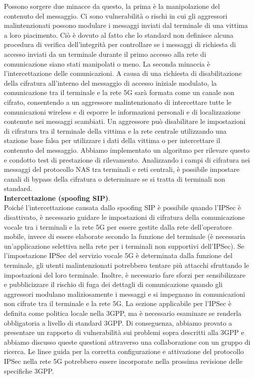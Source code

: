 \documentclass[english]{article}
\begin{document}
Possono sorgere due minacce da questo, la prima è la manipolazione del
contenuto del messaggio. Ci sono vulnerabilità o rischi in cui gli aggressori
malintenzionati possono modulare i messaggi inviati dal terminale di una
vittima a loro piacimento. Ciò è dovuto al fatto che lo standard non definisce
alcuna procedura di verifica dell'integrità per controllare se i messaggi di
richiesta di accesso inviati da un terminale durante il primo accesso alla rete
di comunicazione siano stati manipolati o meno. La seconda minaccia è
l'intercettazione delle comunicazioni. A causa di una richiesta di
disabilitazione della cifratura all'interno del messaggio di accesso iniziale
modulato, la comunicazione tra il terminale e la rete 5G sarà formata come un
canale non cifrato, consentendo a un aggressore malintenzionato di intercettare
tutte le comunicazioni wireless e di esporre le informazioni personali e di
localizzazione contenute nei messaggi scambiati. Un aggressore può disabilitare
le impostazioni di cifratura tra il terminale della vittima e la rete centrale
utilizzando una stazione base falsa per utilizzare i dati della vittima o per
intercettare il contenuto del messaggio. Abbiamo implementato un algoritmo per
rilevare questo e condotto test di prestazione di rilevamento. Analizzando i
campi di cifratura nei messaggi del protocollo NAS tra terminali e reti
centrali, è possibile impostare canali di bypass della cifratura o determinare
se si tratta di terminali non standard. \\[0.2cm]
\textbf{Intercettazione (spoofing SIP)}.\\ Poiché l'intercettazione causata dallo spoofing
SIP è possibile quando l'IPSec è disattivato, è necessario guidare le
impostazioni di cifratura della comunicazione vocale tra i terminali e la rete
5G per essere gestite dalla rete dell'operatore mobile, invece di essere
elaborate secondo la funzione del terminale (è necessaria un'applicazione
selettiva nella rete per i terminali non supportivi dell'IPSec). Se
l'impostazione IPSec del servizio vocale 5G è determinata dalla funzione del
terminale, gli utenti malintenzionati potrebbero tentare più attacchi
sfruttando le impostazioni del loro terminale. Inoltre, è necessario fare
sforzi per sensibilizzare e pubblicizzare il rischio di fuga dei dettagli di
comunicazione quando gli aggressori modulano maliziosamente i messaggi e si
impegnano in comunicazioni non cifrate tra il terminale e la rete 5G. La
sezione applicabile per l'IPSec è definita come politica locale nella 3GPP, ma
è necessario esaminare se renderla obbligatoria a livello di standard 3GPP. Di
conseguenza, abbiamo provato a presentare un rapporto di vulnerabilità sui
problemi sopra descritti alla 3GPP e abbiamo discusso queste questioni
attraverso una collaborazione con un gruppo di ricerca. Le linee guida per la
corretta configurazione e attivazione del protocollo IPSec nella rete 5G
potrebbero essere incorporate nella prossima revisione delle specifiche 3GPP.
\end{document}
